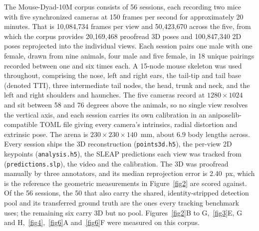 The Mouse-Dyad-10M corpus consists of 56 sessions, each recording two mice with
five synchronized cameras at 150 frames per second for approximately 20 minutes.
That is 10,084,734 frames per view and 50,423,670 across the five, from which the
corpus provides 20,169,468 proofread 3D poses and 100,847,340 2D poses
reprojected into the individual views. Each session pairs one male with one
female, drawn from nine animals, four male and five female, in 18 unique
pairings recorded between one and six times each. A 15-node mouse skeleton was
used throughout, comprising the nose, left and right ears, the tail-tip and tail
base (denoted TTI), three intermediate tail nodes, the head, trunk and neck, and
the left and right shoulders and haunches. The five cameras record at
$1280 \times 1024$ and sit between 58 and 76 degrees above the animals, so no
single view resolves the vertical axis, and each session carries its own
calibration in an aniposelib-compatible TOML file giving every camera's
intrinsics, radial distortion and extrinsic pose. The arena is
$230 \times 230 \times 140$~mm, about 6.9 body lengths across. Every session ships
the 3D reconstruction (\texttt{points3d.h5}), the per-view 2D keypoints
(\texttt{analysis.h5}), the SLEAP predictions each view was tracked from
(\texttt{predictions.slp}), the video and the calibration. The 3D was proofread
manually by three annotators, and its median reprojection error is 2.40~px, which
is the reference the geometric measurements in Figure~\ref{fig2} are scored
against. Of the 56 sessions, the 50 that also carry the shared, identity-stripped
detection pool and its transferred ground truth are the ones every tracking
benchmark uses; the remaining six carry 3D but no pool. Figures~\ref{fig2}B to
G,~\ref{fig3}E, G and H,~\ref{fig4},~\ref{fig6}A and~\ref{fig6}F were measured on
this corpus.


